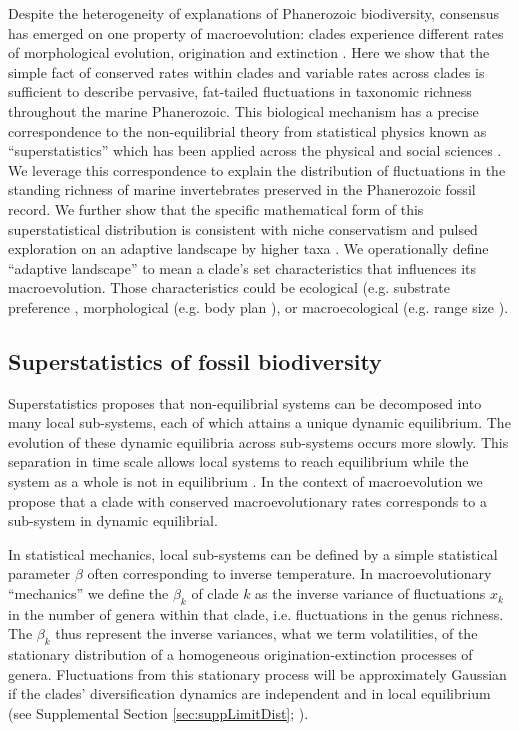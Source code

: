 \documentclass[12pt]{article}
\let\citep=\cite
\begin{document}
Despite the heterogeneity of explanations of Phanerozoic biodiversity,
consensus has emerged on one property of macroevolution: clades
experience different rates of morphological evolution, origination and
extinction \citep{simpson1953, sepkoski1984, holman1989, gilinsky1994,
  stadler2011, rabosky2014}. Here we show that the simple fact of
conserved rates within clades and variable rates across clades is
sufficient to describe pervasive, fat-tailed fluctuations in taxonomic
richness throughout the marine Phanerozoic.  This biological mechanism
has a precise correspondence to the non-equilibrial theory from
statistical physics known as ``superstatistics'' \citep{beck2003}
which has been applied across the physical and social sciences
\citep{beck2004, fuentes2009}. We leverage this correspondence to
explain the distribution of fluctuations in the standing richness of
marine invertebrates preserved in the Phanerozoic fossil record. We
further show that the specific mathematical form of this
superstatistical distribution is consistent with niche conservatism
\citep{roy2009range, hopkins2014} and pulsed exploration on an
adaptive landscape by higher taxa \citep{eldredgeGould1972,
  newman1985adaptive, hopkins2014}. We operationally define ``adaptive
landscape'' to mean a clade's set characteristics that influences its
macroevolution. Those characteristics could be ecological (e.g.
substrate preference \citep{bambach1983, bush2007, hopkins2014},
morphological (e.g. body plan \citep{erwin2012}), or macroecological
(e.g. range size \citep{harnik2011, foote2008paleobiol}).


\subsection{Superstatistics of fossil biodiversity}

Superstatistics \citep{beck2003} proposes that non-equilibrial systems
can be decomposed into many local sub-systems, each of which attains a
unique dynamic equilibrium. The evolution of these dynamic equilibria
across sub-systems occurs more slowly. This separation in time scale
allows local systems to reach equilibrium while the system as a whole
is not in equilibrium \citep{beck2003}.  In the context of
macroevolution we propose that a clade with conserved
macroevolutionary rates corresponds to a sub-system in dynamic
equilibrial.

In statistical mechanics, local sub-systems can be defined by a simple
statistical parameter $\beta$ often corresponding to inverse
temperature. In macroevolutionary ``mechanics'' we define the
$\beta_k$ of clade $k$ as the inverse variance of fluctuations $x_k$
in the number of genera within that clade, i.e. fluctuations in the
genus richness.  The $\beta_k$ thus represent the inverse variances,
what we term volatilities, of the stationary distribution of a
homogeneous origination-extinction processes of genera. Fluctuations
from this stationary process will be approximately Gaussian if the
clades' diversification dynamics are independent and in local
equilibrium (see Supplemental Section \ref{sec:suppLimitDist};
\citep{keilson1970, grassmann1987}).
\end{document}
